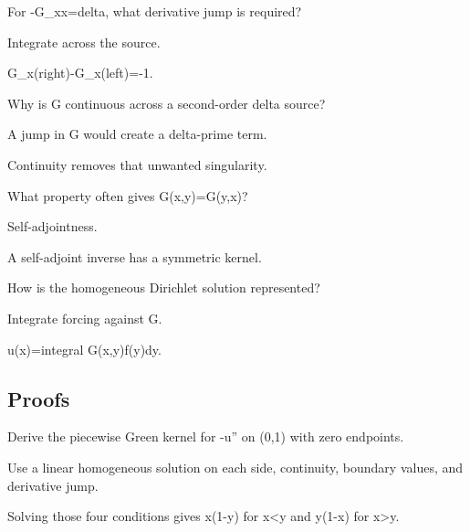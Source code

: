 \begin{exercise}[Jump]\label{exr:iii25-expand-02}
For -G\_xx=delta, what derivative jump is required?
\end{exercise}
\begin{hint}
Integrate across the source.
\end{hint}
\begin{solution}
G\_x(right)-G\_x(left)=-1.
\end{solution}

\begin{exercise}[Continuity]\label{exr:iii25-expand-03}
Why is G continuous across a second-order delta source?
\end{exercise}
\begin{hint}
A jump in G would create a delta-prime term.
\end{hint}
\begin{solution}
Continuity removes that unwanted singularity.
\end{solution}

\begin{exercise}[Symmetry]\label{exr:iii25-expand-04}
What property often gives G(x,y)=G(y,x)?
\end{exercise}
\begin{hint}
Self-adjointness.
\end{hint}
\begin{solution}
A self-adjoint inverse has a symmetric kernel.
\end{solution}

\begin{exercise}[Representation]\label{exr:iii25-expand-05}
How is the homogeneous Dirichlet solution represented?
\end{exercise}
\begin{hint}
Integrate forcing against G.
\end{hint}
\begin{solution}
u(x)=integral G(x,y)f(y)dy.
\end{solution}

\subsection*{Proofs}

\begin{exercise}\label{exr:iii25-expand-06}
Derive the piecewise Green kernel for -u'' on (0,1) with zero endpoints.
\end{exercise}
\begin{hint}
Use a linear homogeneous solution on each side, continuity, boundary values, and derivative jump.
\end{hint}
\begin{solution}
Solving those four conditions gives x(1-y) for x<y and y(1-x) for x>y.
\end{solution}

